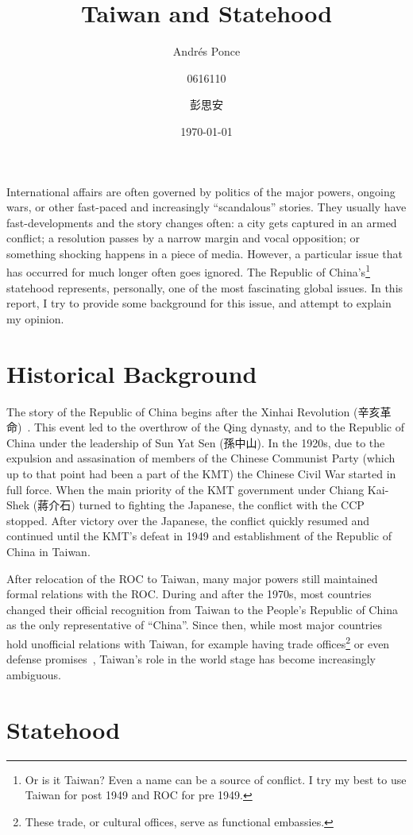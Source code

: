 \documentclass{article}
\author{Andr\'es Ponce \\
\and
0616110 \\
\and
彭思安
}
\title{Taiwan and Statehood}
\date{\today}
\begin{document}
\maketitle
International affairs are often governed by politics of the major powers, ongoing wars,
or other fast-paced and increasingly ``scandalous'' stories. They usually have fast-developments
and the story changes often: a city gets captured in an armed conflict; a resolution 
passes by a narrow margin and vocal opposition; or something shocking happens in a 
piece of media. 
However, a particular issue that has occurred for much longer often goes ignored. 
The Republic of China's\footnote{Or is it Taiwan? Even a name can be a source of conflict. I try my best
to use Taiwan for post 1949 and ROC for pre 1949.}
statehood represents, personally, one of the most fascinating global issues. 
In this report, I try to provide some background for this issue, and attempt to 
explain my opinion.

\section{Historical Background}
The story of the Republic of China begins after the Xinhai Revolution (辛亥革命)~\cite{ChineseRevolution}.
This event led to the overthrow of the Qing dynasty, and to the Republic of China
under the leadership of Sun Yat Sen (孫中山). 
In the 1920s, due to the expulsion and 
assasination of members of the Chinese Communist Party (which up to that point had
been a part of the KMT) the Chinese Civil War started in full force. 
When the main priority of the KMT government under Chiang Kai-Shek (蔣介石) turned to 
fighting the Japanese, the conflict with the CCP stopped. After victory over the 
Japanese, the conflict quickly resumed and continued until the KMT's defeat in 1949
and establishment of the Republic of China in Taiwan.

After relocation of the ROC to Taiwan, many major powers still maintained formal
relations with the ROC\@. During and after the 1970s, most countries changed their
official recognition from Taiwan to the People's Republic of China as the only 
representative of ``China''. Since then, while most major countries hold unofficial 
relations with Taiwan, for example having trade offices\footnote{These trade, or cultural offices, serve as functional embassies.}
or even defense promises~\cite{TaiwanRelationsAct}, Taiwan's role in the world stage has become increasingly ambiguous.

\section{Statehood}
\end{document}
